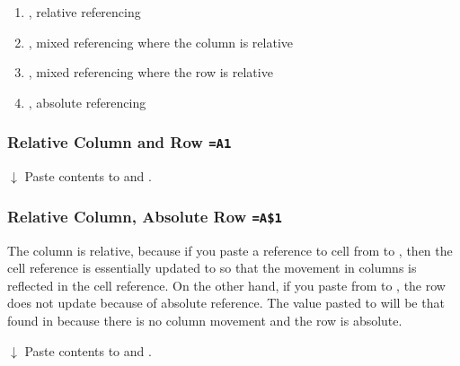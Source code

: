 \begin{enumerate}
    \item {}, relative referencing
    \item {}, mixed referencing where the column is relative
    \item {}, mixed referencing where the row is relative
    \item {}, absolute referencing
\end{enumerate}

\subsubsection{Relative Column and Row \texttt{=A1}}

\begin{center}

$\downarrow$ Paste  contents to  and .

\end{center}


\subsubsection{Relative Column, Absolute Row \texttt{=A\$1}}

The column is relative, because if you paste a reference to cell  from  to , then the cell reference is essentially updated to  so that the movement in columns is reflected in the cell reference. On the other hand, if you paste  from  to , the row does not update because of absolute reference. The value pasted to  will be that found in  because there is no column movement and the row is absolute. 

\begin{center}

$\downarrow$ Paste  contents to  and .

\end{center}

